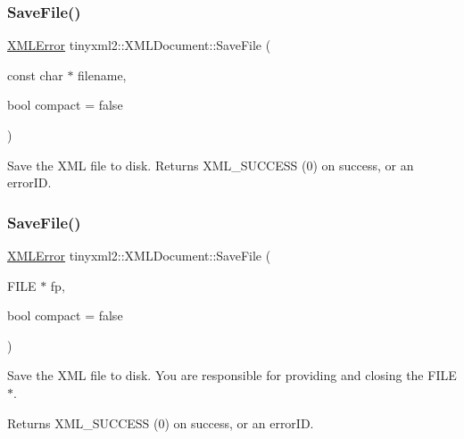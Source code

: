 \mbox{\label{classtinyxml2_1_1_x_m_l_document_a73ac416b4a2aa0952e841220eb3da18f}} 
\subsubsection{\texorpdfstring{Save\+File()}{SaveFile()}\hspace{0.1cm}{\footnotesize\ttfamily [1/2]}}
{\footnotesize\ttfamily \mbox{\hyperlink{namespacetinyxml2_a1fbf88509c3ac88c09117b1947414e08}{X\+M\+L\+Error}} tinyxml2\+::\+X\+M\+L\+Document\+::\+Save\+File (\begin{DoxyParamCaption}\item[{const char $\ast$}]{filename,  }\item[{bool}]{compact = {\ttfamily false} }\end{DoxyParamCaption})}

Save the X\+ML file to disk. Returns X\+M\+L\+\_\+\+S\+U\+C\+C\+E\+SS (0) on success, or an error\+ID. \mbox{\label{classtinyxml2_1_1_x_m_l_document_a8b95779479a0035acc67b3a61dfe1b74}} 
\subsubsection{\texorpdfstring{Save\+File()}{SaveFile()}\hspace{0.1cm}{\footnotesize\ttfamily [2/2]}}
{\footnotesize\ttfamily \mbox{\hyperlink{namespacetinyxml2_a1fbf88509c3ac88c09117b1947414e08}{X\+M\+L\+Error}} tinyxml2\+::\+X\+M\+L\+Document\+::\+Save\+File (\begin{DoxyParamCaption}\item[{F\+I\+LE $\ast$}]{fp,  }\item[{bool}]{compact = {\ttfamily false} }\end{DoxyParamCaption})}

Save the X\+ML file to disk. You are responsible for providing and closing the F\+I\+L\+E$\ast$.

Returns X\+M\+L\+\_\+\+S\+U\+C\+C\+E\+SS (0) on success, or an error\+ID. \mbox{\label{classtinyxml2_1_1_x_m_l_document_a14419b698f7c4b140df4e80f3f0c93b0}} 
